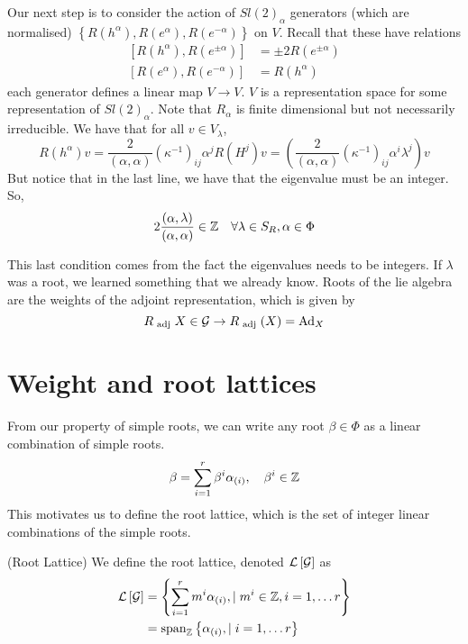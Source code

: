 Our next step is to consider the action of $ Sl ( 2) _ \alpha $ 
generators (which are normalised) 
$ \left\{  R ( h ^ \alpha ), R ( e ^ \alpha ) , R ( e ^{ - \alpha  } )   \right\}  $ on $ V $. 
Recall that these have relations
\begin{align*}
	\left[  R ( h ^ \alpha ), R ( e ^{ \pm \alpha } )   \right] &= \pm 2 R \left( e ^{ \pm \alpha }  \right)   \\
	\left[  R ( e ^ \alpha ) , R ( e ^{ - \alpha } )  \right]   & = R ( h ^ \alpha ) 
\end{align*}
each generator defines a linear map $ V \to V $. 
$ V $ is a representation space for some representation 
of $ Sl ( 2)_ \alpha  $. 
Note that $ R _ \alpha $ is finite dimensional but not necessarily irreducible. 
We have that for all $ v \in V _ \lambda $, 
\[
	R ( h ^ \alpha ) v = \frac{ 2 }{ \left( \alpha, \alpha  \right)  } 
\left( \kappa ^{ - 1}  \right)  _{ ij } \alpha ^ j R \left(  H ^ j  \right)  v = 
\left( \frac{2}{\left( \alpha, \alpha  \right)  } \left( \kappa ^{ - 1}  \right)  
_{ij } \alpha ^ i \lambda ^ j \right)  v  
\] But notice that in the last line, we have that 
the eigenvalue must be an integer. 
So, 
\[
2 \frac{\left( \alpha, \lambda  \right)  }{ \left( \alpha , \alpha  \right)  } \in \mathbb{Z} \quad
\forall \lambda \in S _ R , \alpha \in \Phi  
\]

This last condition comes from the fact the eigenvalues needs to be integers.  If $ \lambda $ was a root, we 
learned something that we already know. 
 Roots of the lie algebra are the weights of the adjoint representation, which 
 is given by 
 \[
	 R _{ \text{ adj } } X \in \mathcal{ G } \to R _{ \text{ adj } } ( X)  = \text{Ad}_ X 
 \]

 \pagebreak
\section{Weight and root lattices} 
From our property of simple roots, we can write any 
root $ \beta \in \Phi  $ as a linear combination of 
simple roots. 
\[
	\beta = \sum _{ i = 1 } ^ r \beta ^ i \alpha _{ \left( i  \right)  } , \quad 
	\beta ^ i \in \mathbb{Z} 
\] This motivates us to define the root lattice, 
which is the set of integer linear combinations of the 
simple roots. 
\begin{defn}{(Root Lattice)}
	We define the root lattice, denoted $ \mathcal{ L } \left[  \mathcal{ G }  \right]  $
	as 
	\begin{align*}
	 \mathcal{ L } \left[  \mathcal{ G }  \right] &=  \left\{  \sum_{ i= 1 } ^ r 
	 m ^ i \alpha _{ \left( i  \right)  } , \mid m ^ i \in \mathbb{Z} , i = 1 , \dots r \right\}   \\
					      &=  \text{span}_{ \mathbb{Z} } \left\{  \alpha _{ \left( i  \right)  } 
					       , \mid i = 1 , \dots r \right\} 
 \end{align*}
\end{defn}

